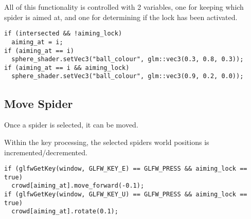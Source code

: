 \documentclass[11pt]{article}
\begin{document}
All of this functionality is controlled with 2 variables, one for keeping which spider is aimed at, and 
one for determining if the lock has been activated.
\begin{verbatim}
if (intersected && !aiming_lock) 
  aiming_at = i;
if (aiming_at == i)
  sphere_shader.setVec3("ball_colour", glm::vec3(0.3, 0.8, 0.3));
if (aiming_at == i && aiming_lock)
  sphere_shader.setVec3("ball_colour", glm::vec3(0.9, 0.2, 0.0));

\end{verbatim}
\subsection*{Move Spider}
\label{sec:org9789936}
Once a spider is selected, it can be moved.  

Within the key processing, the selected spiders world positions is incremented/decremented.
\begin{verbatim}
if (glfwGetKey(window, GLFW_KEY_E) == GLFW_PRESS && aiming_lock == true) 
  crowd[aiming_at].move_forward(-0.1);
if (glfwGetKey(window, GLFW_KEY_U) == GLFW_PRESS && aiming_lock == true) 
  crowd[aiming_at].rotate(0.1);
\end{verbatim}
\end{document}

